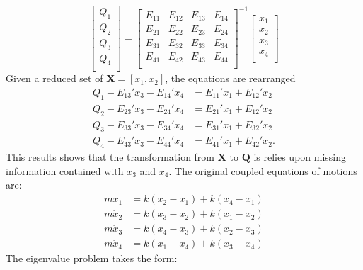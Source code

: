 \begin{equation}
\begin{bmatrix}
   Q_1\\
   Q_2\\
   Q_3\\
   Q_4\\
\end{bmatrix}=
\begin{bmatrix}
   E_{11} & E_{12} & E_{13} & E_{14} \\
   E_{21} & E_{22} & E_{23} & E_{24} \\
   E_{31} & E_{32} & E_{33} & E_{34} \\
   E_{41} & E_{42} & E_{43} & E_{44} \\
\end{bmatrix}^{-1}
\begin{bmatrix}
   x_1\\
   x_2\\
   x_3\\
   x_4\\
\end{bmatrix}
\end{equation}
Given a reduced set of $\bm{X}= [x_1,x_2]$, the equations are rearranged
\begin{equation}
\begin{split}
Q_1-E_{13}'x_3-E_{14}'x_4&= E_{11}'x_1 + E_{12}'x_2\\
Q_2-E_{23}'x_3-E_{24}'x_4&= E_{21}'x_1 + E_{12}'x_2\\
Q_3-E_{33}'x_3-E_{34}'x_4&= E_{31}'x_1 + E_{32}'x_2\\
Q_4-E_{43}'x_3-E_{44}'x_4&= E_{41}'x_1 + E_{42}'x_2.
\end{split}
\end{equation}
This results shows that the transformation from $\bm{X}$ to $\bm{Q}$ is relies upon missing information contained with $x_3$ and $x_4$. The original coupled equations of motions are:
\begin{align}
m\ddot{x}_1&=k(x_2-x_1)+k(x_4-x_1)\\
m\ddot{x}_2&=k(x_3-x_2)+k(x_1-x_2)\\
m\ddot{x}_3&=k(x_4-x_3)+k(x_2-x_3)\\
m\ddot{x}_4&=k(x_1-x_4)+k(x_3-x_4)
\end{align}
The eigenvalue problem takes the form:
